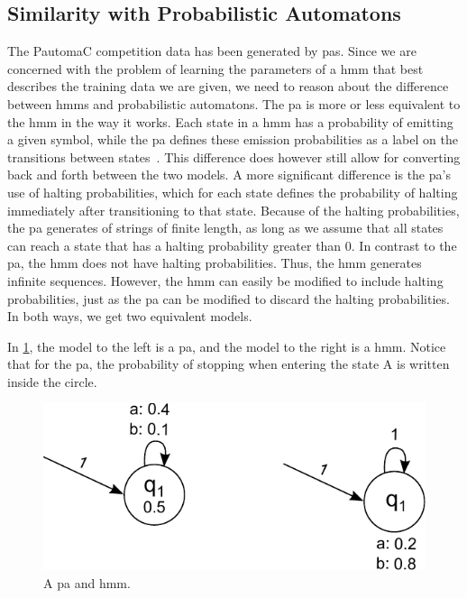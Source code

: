 \subsection{Similarity with Probabilistic Automatons}
\label{sec:hmm_vs_pa}
The PautomaC competition data has been generated by \gls{pa}s. Since we are concerned with the problem of learning the parameters of a \gls{hmm} that best describes the training data we are given, we need to reason about the difference between \gls{hmm}s and probabilistic automatons. The \gls{pa} is more or less equivalent to the \gls{hmm} in the way it works. Each state in a \gls{hmm} has a probability of emitting a given symbol, while the \gls{pa} defines these emission probabilities as a label on the transitions between states~\cite{PautomaCTR}. This difference does however still allow for converting back and forth between the two models.
A more significant difference is the \gls{pa}'s use of halting probabilities, which for each state defines the probability of halting immediately after transitioning to that state. Because of the halting probabilities, the \gls{pa} generates of strings of finite length, as long as we assume that all states can reach a state that has a halting probability greater than 0. In contrast to the \gls{pa}, the \gls{hmm} does not have halting probabilities. Thus, the \gls{hmm} generates infinite sequences. However, the \gls{hmm} can easily be modified to include halting probabilities, just as the \gls{pa} can be modified to discard the halting probabilities. In both ways, we get two equivalent models.

In \ref{fig:model-with-and-without-stop-symbols}, the model to the left is a \gls{pa}, and the model to the right is a \gls{hmm}.
Notice that for the \gls{pa}, the probability of stopping when entering the state A is written inside the circle.

\begin{figure}
\begin{centering}
\includegraphics[scale=1]{./pictures/model-with-and-without-stop-symbols.pdf}
\caption{A \gls{pa} and \gls{hmm}.}
\label{fig:model-with-and-without-stop-symbols}
\end{centering}
\end{figure}


